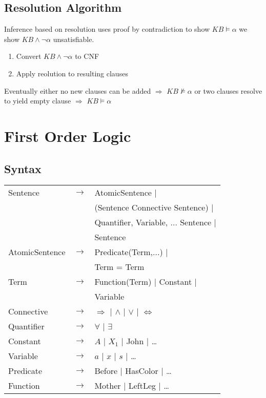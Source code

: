 \begin{multicols}{4}
\subsection{Resolution Algorithm}

Inference based on resolution uses proof by contradiction to show $KB \models \alpha$ we show $KB \land \lnot \alpha$ unsatisfiable.

\begin{enumerate}
\item Convert $KB \land \lnot \alpha$ to CNF
\item Apply reolution to resulting clauses
\end{enumerate}

Eventually either no new clauses can be added $\Rightarrow$ $KB \not\models \alpha$ or two clauses resolve to yield empty clause $\Rightarrow$ $KB \models \alpha$

\section{First Order Logic}
\subsection{Syntax}
\begin{tabular}{l l l}
Sentence		& $\rightarrow$	& AtomicSentence |\\
				&				& (Sentence Connective Sentence) |\\
				&				& Quantifier, Variable, ... Sentence |\\
				&				& Sentence \\
AtomicSentence	& $\rightarrow$	& Predicate(Term,...) |\\
				&				& Term = Term \\
Term			& $\rightarrow$	& Function(Term) | Constant |\\
				&				& Variable \\
Connective		& $\rightarrow$	& $\Rightarrow$ | $\land$ | $\lor$ | $\Leftrightarrow$ \\
Quantifier		& $\rightarrow$	& $\forall$ | $\exists$ \\
Constant		& $\rightarrow$	& $A$ | $X_1$ | John | \dots \\
Variable		& $\rightarrow$	& $a$ | $x$ | $s$ | \dots \\
Predicate		& $\rightarrow$	& Before | HasColor | \dots \\
Function		& $\rightarrow$	& Mother | LeftLeg | \dots \\
\end{tabular}


\end{multicols}

